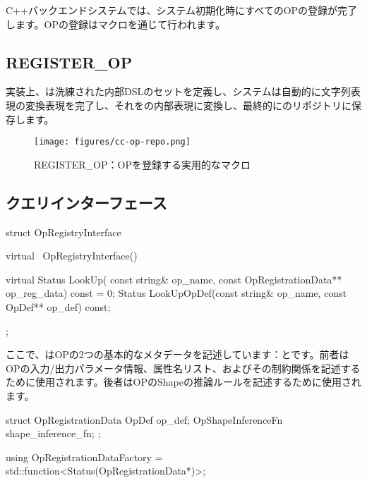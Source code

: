 \begin{content}

C++バックエンドシステムでは、システム初期化時にすべてのOPの登録が完了します。OPの登録はマクロを通じて行われます。

\subsection{REGISTER\_OP}

実装上、は洗練された内部DSLのセットを定義し、システムは自動的に文字列表現の変換表現を完了し、それをの内部表現に変換し、最終的にのリポジトリに保存します。

\begin{figure}[!h]
\centering
\texttt{[image: figures/cc-op-repo.png]}
\caption{REGISTER\_OP：OPを登録する実用的なマクロ}
 \label{fig:cc-op-repo}
\end{figure}

\subsection{クエリインターフェース}

\begin{leftbar}
\begin{c++}
struct OpRegistryInterface {
  virtual ~OpRegistryInterface() {}

  virtual Status LookUp(
    const string& op_name,
    const OpRegistrationData** op_reg_data) const = 0;
  Status LookUpOpDef(const string& op_name, const OpDef** op_def) const;
};
\end{c++}
\end{leftbar}

ここで、はOPの2つの基本的なメタデータを記述しています：とです。前者はOPの入力/出力パラメータ情報、属性名リスト、およびその制約関係を記述するために使用されます。後者はOPのShapeの推論ルールを記述するために使用されます。

\begin{leftbar}
\begin{c++}
struct OpRegistrationData {
  OpDef op_def;
  OpShapeInferenceFn shape_inference_fn;
};

using OpRegistrationDataFactory = 
  std::function<Status(OpRegistrationData*)>;
\end{c++}
\end{leftbar}


\end{content}

